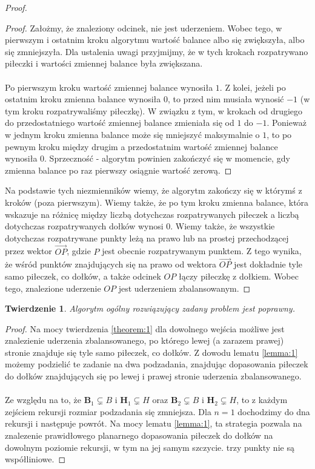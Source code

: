 \documentclass[10pt,a4paper]{article}
\newtheorem{theorem}{Twierdzenie}
\begin{document}
\begin{proof}
		\begin{proof}
			Założmy, że znaleziony odcinek, nie jest uderzeniem. Wobec tego, w pierwszym i ostatnim kroku algorytmu wartość balance albo się zwiększyła, albo się zmniejszyła. Dla ustalenia uwagi przyjmijmy, że w tych krokach rozpatrywano piłeczki i wartości zmiennej balance była zwiększana.\\~\\
			Po pierwszym kroku wartość zmiennej balance wynosiła $1$. Z kolei, jeżeli po ostatnim kroku zmienna balance wynosiła $0$, to przed nim musiała wynosić $-1$ (w tym kroku rozpatrywaliśmy piłeczkę). W związku z tym, w krokach od drugiego do przedostatniego wartość zmiennej balance zmieniała się od $1$ do $-1$. Ponieważ w jednym kroku zmienna balance może się mniejszyć maksymalnie o $1$, to po pewnym kroku między drugim a przedostatnim wartość zmiennej balance wynosiła $0$. Sprzeczność - algorytm powinien zakończyć się w momencie, gdy zmienna balance po raz pierwszy osiągnie wartość zerową.
		\end{proof}

		Na podstawie tych niezmienników wiemy, że algorytm zakończy się w którymś z kroków (poza pierwszym). Wiemy także, że po tym kroku zmienna balance, która wskazuje na różnicę między liczbą dotychczas rozpatrywanych piłeczek a liczbą dotychczas rozpatrywanych dołków wynosi $0$. Wiemy także, że wszystkie dotychczas rozpatrywane punkty leżą na prawo lub na prostej przechodzącej przez wektor $\overrightarrow{OP}$, gdzie $P$ jest obecnie rozpatrywanym punktem. Z tego wynika, że wśród punktów znajdujących się na prawo od wektora $\overrightarrow{OP}$ jest dokładnie tyle samo piłeczek, co dołków, a także odcinek $OP$ łączy piłeczkę z dołkiem. Wobec tego, znalezione uderzenie $OP$ jest uderzeniem zbalansowanym.

	\end{proof}

	\begin{theorem}
		Algorytm ogólny rozwiązujący zadany problem jest poprawny.
	\end{theorem}
	
	\begin{proof}
		Na mocy twierdzenia \ref{theorem:1} dla dowolnego wejścia możliwe jest znalezienie uderzenia zbalansowanego, po którego lewej (a zarazem prawej) stronie znajduje się tyle samo piłeczek, co dołków. Z dowodu lematu \ref{lemma:1} możemy podzielić te zadanie na dwa podzadania, znajdując dopasowania piłeczek do dołków znajdujących się po lewej i prawej stronie uderzenia zbalansowanego. \\~\\
		Ze względu na to, że $\mathbf{B}_{1} \subsetneq B$ i $\mathbf{H}_{1} \subsetneq H$ oraz $\mathbf{B}_{2} \subsetneq B$ i $\mathbf{H}_{2} \subsetneq H$, to z każdym zejściem rekursji rozmiar podzadania się zmniejsza. Dla $n = 1$ dochodzimy do dna rekursji i następuje powrót. Na mocy lematu \ref{lemma:1}, ta strategia pozwala na znalezenie prawidłowego planarnego dopasowania piłeczek do dołków na dowolnym poziomie rekursji, w tym na jej samym szczycie. trzy punkty nie są współliniowe.
	\end{proof}
	
\end{document}
